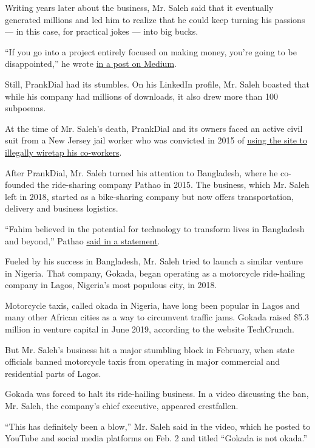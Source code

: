 Writing years later about the business, Mr. Saleh said that it
eventually generated millions and led him to realize that he could keep
turning his passions --- in this case, for practical jokes --- into big
bucks.

``If you go into a project entirely focused on making money, you're
going to be disappointed,'' he wrote
\href{https://medium.com/datadriveninvestor/what-i-learned-from-turning-a-prank-calling-passion-project-into-a-multi-million-dollar-product-1486b4cda535}{in
a post on Medium}.

Still, PrankDial had its stumbles. On his LinkedIn profile, Mr. Saleh
boasted that while his company had millions of downloads, it also drew
more than 100 subpoenas.

At the time of Mr. Saleh's death, PrankDial and its owners faced an
active civil suit from a New Jersey jail worker who was convicted in
2015 of
\href{https://www.nj.com/hudson/2015/09/ex-deputy_director_of_hudson_county_jail_sentenced.html}{using
the site to illegally wiretap his co-workers}.

After PrankDial, Mr. Saleh turned his attention to Bangladesh, where he
co-founded the ride-sharing company Pathao in 2015. The business, which
Mr. Saleh left in 2018, started as a bike-sharing company but now offers
transportation, delivery and business logistics.

``Fahim believed in the potential for technology to transform lives in
Bangladesh and beyond,'' Pathao
\href{https://www.instagram.com/p/CCqBMNcDFIT/}{said in a statement}.

Fueled by his success in Bangladesh, Mr. Saleh tried to launch a similar
venture in Nigeria. That company, Gokada, began operating as a
motorcycle ride-hailing company in Lagos, Nigeria's most populous city,
in 2018.

Motorcycle taxis, called okada in Nigeria, have long been popular in
Lagos and many other African cities as a way to circumvent traffic jams.
Gokada raised \$5.3 million in venture capital in June 2019, according
to the website TechCrunch.

But Mr. Saleh's business hit a major stumbling block in February, when
state officials banned motorcycle taxis from operating in major
commercial and residential parts of Lagos.

Gokada was forced to halt its ride-hailing business. In a video
discussing the ban, Mr. Saleh, the company's chief executive, appeared
crestfallen.

``This has definitely been a blow,'' Mr. Saleh said in the video, which
he posted to YouTube and social media platforms on Feb. 2 and titled
``Gokada is not okada.''

